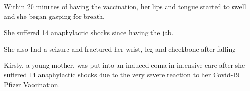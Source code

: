 Within 20 minutes of having the vaccination, her lips and tongue started to
swell and she began gasping for breath.

She suffered 14 anaphylactic shocks since having the jab.

She also had a seizure and fractured her wrist, leg and cheekbone after falling

Kirsty, a young mother, was put into an induced coma in intensive care after she
suffered 14 anaphylactic shocks due to the very severe reaction to her Covid-19
Pfizer Vaccination.

